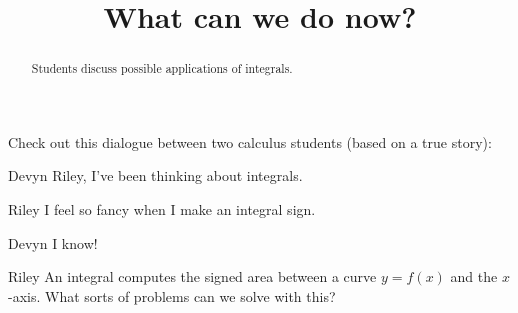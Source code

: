 \documentclass{ximera}
\title[Break-Ground:]{What can we do now?}
\begin{document}
\begin{abstract}
Students discuss possible applications of integrals.
\end{abstract}
\maketitle


Check out this dialogue between two calculus students (based on a true
story):

\begin{dialogue}
\item[Devyn] Riley, I've been thinking about integrals.
\item[Riley] I feel so fancy when I make an integral sign.
\item[Devyn] I know!
\item[Riley] An integral computes the signed area between a curve
  $y=f(x)$ and the $x$-axis. What sorts of problems can we solve with
  this?
\item[] %
\end{dialogue}



\begin{problem}
\end{problem}


\end{document}
